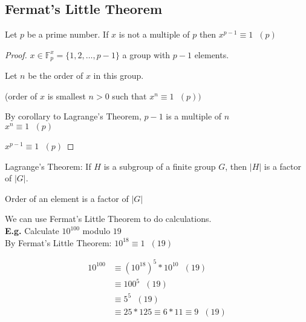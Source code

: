 \documentclass[11pt]{article}
\begin{document}
\subsection{Fermat's Little Theorem}
\begin{theorem}
	Let $p$ be a prime number. If $x$ is not a multiple of $p$ then $x^{p-1} \equiv 1 \hspace{7pt} (p)$
\end{theorem}

\begin{proof}
	$x \in \mathbb{F}_{p}^{x} = \{1,2,\dots, p-1\}$ a group with $p-1$ elements.

	Let $n$ be the order of $x$ in this group. 
	
	(order of $x$ is smallest $n>0$ such that $x^{n} \equiv 1 \hspace{7pt} (p) )$

	By corollary to Lagrange's Theorem, $p-1$ is a multiple of $n$\\

	$x^n \equiv 1\hspace{7pt} (p) $

	$x^{p-1} \equiv 1 \hspace{7pt} (p)$
\end{proof}
\begin{theorem}
Lagrange's Theorem: If $H$ is a subgroup of a finite group $G$, then $|H|$ is a factor of $|G|$.
\end{theorem}

\begin{corollary}
Order of an element is a factor of $|G|$
\end{corollary}
We can use Fermat's Little Theorem to do calculations.\\
\textbf{E.g.} Calculate $10^{100}$ modulo $19$\\

By Fermat's Little Theorem: $10^{18} \equiv 1 \hspace{7pt} (19)$ 

\begin{align*}
	10^{100} &\equiv  (10^{18})^{5} * 10^{10} \hspace{7pt} (19)\\
	& \equiv  100^{5}\hspace{7pt} (19)\\
	& \equiv  5^5\hspace{7pt} (19) \\
	& \equiv 25 * 125 \equiv 6*11 \equiv 9 \hspace{7pt} (19) 
\end{align*}
\end{document}
